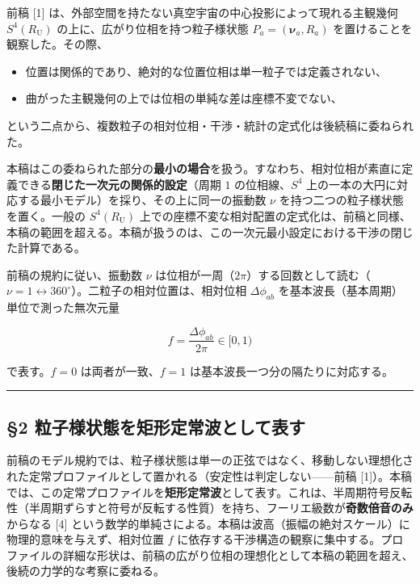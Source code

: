 \documentclass[
]{ltjsarticle}
\providecommand{\tightlist}{%
  \setlength{\itemsep}{0pt}\setlength{\parskip}{0pt}}
\begin{document}
前稿 {[}1{]}
は、外部空間を持たない真空宇宙の中心投影によって現れる主観幾何
\(S^4(R_{\mathrm U})\) の上に、広がり位相を持つ粒子様状態
\(P_a=(\boldsymbol{\nu}_a,R_a)\) を置けることを観察した。その際、

\begin{itemize}
\tightlist
\item
  位置は関係的であり、絶対的な位置位相は単一粒子では定義されない、
\item
  曲がった主観幾何の上では位相の単純な差は座標不変でない、
\end{itemize}

という二点から、複数粒子の相対位相・干渉・統計の定式化は後続稿に委ねられた。

本稿はこの委ねられた部分の\textbf{最小の場合}を扱う。すなわち、相対位相が素直に定義できる\textbf{閉じた一次元の関係的設定}（周期
\(1\) の位相線、\(S^4\)
上の一本の大円に対応する最小モデル）を採り、その上に同一の振動数 \(\nu\)
を持つ二つの粒子様状態を置く。一般の \(S^4(R_{\mathrm U})\)
上での座標不変な相対配置の定式化は、前稿と同様、本稿の範囲を超える。本稿が扱うのは、この一次元最小設定における干渉の閉じた計算である。

前稿の規約に従い、振動数 \(\nu\)
は位相が一周（\(2\pi\)）する回数として読む（\(\nu=1\leftrightarrow360^\circ\)）。二粒子の相対位置は、相対位相
\(\Delta\phi_{ab}\) を基本波長（基本周期）単位で測った無次元量

\[f=\frac{\Delta\phi_{ab}}{2\pi}\in[0,1)\]

で表す。\(f=0\) は両者が一致、\(f=1\)
は基本波長一つ分の隔たりに対応する。

\begin{center}\rule{0.5\linewidth}{0.5pt}\end{center}

\subsection{§2
粒子様状態を矩形定常波として表す}\label{ux7c92ux5b50ux69d8ux72b6ux614bux3092ux77e9ux5f62ux5b9aux5e38ux6ce2ux3068ux3057ux3066ux8868ux3059}

前稿のモデル規約では、粒子様状態は単一の正弦ではなく、移動しない理想化された定常プロファイルとして置かれる（安定性は判定しない------前稿
{[}1{]}）。本稿では、この定常プロファイルを\textbf{矩形定常波}として表す。これは、半周期符号反転性（半周期ずらすと符号が反転する性質）を持ち、フーリエ級数が\textbf{奇数倍音のみ}からなる
{[}4{]}
という数学的単純さによる。本稿は波高（振幅の絶対スケール）に物理的意味を与えず、相対位置
\(f\)
に依存する干渉構造の観察に集中する。プロファイルの詳細な形状は、前稿の広がり位相の理想化として本稿の範囲を超え、後続の力学的な考察に委ねる。
\end{document}
